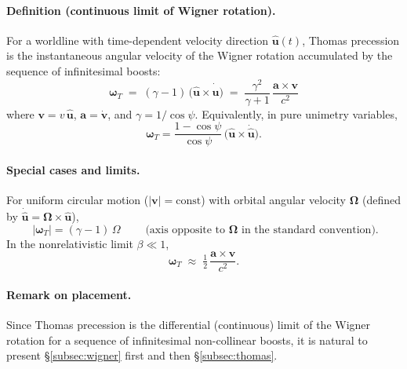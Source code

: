 \documentclass[11pt]{article}
\numberwithin{equation}{section}
\begin{document}
\paragraph{Definition (continuous limit of Wigner rotation).}
For a worldline with time-dependent velocity direction $\hat{\mathbf u}(t)$,
Thomas precession is the instantaneous angular velocity of the Wigner rotation
accumulated by the sequence of infinitesimal boosts:
\begin{equation}
\boxed{\;
\boldsymbol{\omega}_T
\;=\;
(\gamma-1)\,\bigl(\hat{\mathbf u}\times \dot{\hat{\mathbf u}}\bigr)
\;=\;
\frac{\gamma^2}{\gamma+1}\,\frac{\mathbf a\times \mathbf v}{c^2}
\;}
\label{eq:thomas-omega}
\end{equation}
where $\mathbf v=v\,\hat{\mathbf u}$, $\mathbf a=\dot{\mathbf v}$, and
$\gamma=1/\cos\psi$.
Equivalently, in pure unimetry variables,
\begin{equation}
\boldsymbol{\omega}_T
=
\frac{1-\cos\psi}{\cos\psi}\,\bigl(\hat{\mathbf u}\times \dot{\hat{\mathbf u}}\bigr).
\label{eq:thomas-unimetry}
\end{equation}

\paragraph{Special cases and limits.}
For uniform circular motion ($|\mathbf v|=\mathrm{const}$) with orbital angular
velocity $\boldsymbol{\Omega}$ (defined by $\dot{\hat{\mathbf u}}=\boldsymbol{\Omega}\times\hat{\mathbf u}$),
\begin{equation}
\boxed{\;
\lvert \boldsymbol{\omega}_T\rvert=(\gamma-1)\,\Omega
\;}
\qquad
\text{(axis opposite to $\boldsymbol{\Omega}$ in the standard convention).}
\label{eq:thomas-uniform}
\end{equation}
In the nonrelativistic limit $\beta\ll1$,
\begin{equation}
\boldsymbol{\omega}_T \;\approx\; \tfrac{1}{2}\,\frac{\mathbf a\times \mathbf v}{c^2}.
\label{eq:thomas-smallbeta}
\end{equation}

\paragraph{Remark on placement.}
Since Thomas precession is the differential (continuous) limit of the Wigner
rotation for a sequence of infinitesimal non-collinear boosts, it is natural to
present \S\ref{subsec:wigner} first and then \S\ref{subsec:thomas}.
\end{document}
